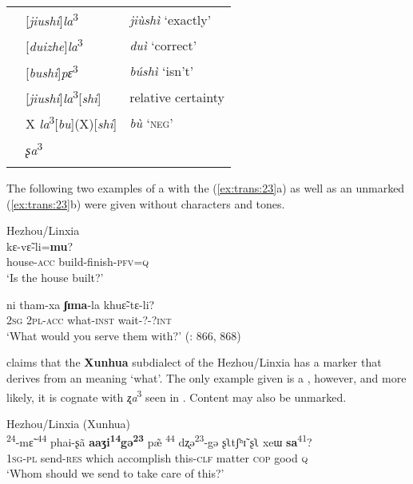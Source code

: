 \begin{table}
\begin{tabularx}{\textwidth}{llQ}
& [\textit{jiushi}]\textit{la}\textsuperscript{3} &  \textit{jiùshì} ‘exactly’\\
& [\textit{duizhe}]\textit{la}\textsuperscript{3} &  \textit{duì} ‘correct’\\
& [\textit{bushi}]\textit{pɛ}\textsuperscript{3} &  \textit{búshì} ‘isn’t’\\
& [\textit{jiushi}]\textit{la}\textsuperscript{3}[\textit{shi}] & relative certainty\\
& X \textit{la}\textsuperscript{3}[\textit{bu}](X)[\textit{shi}] &  \textit{bù} ‘\textsc{neg}’\\
& \textit{ʂa}\textsuperscript{3} & \\
\lspbottomrule
\end{tabularx}
\end{table}

The following two examples of a  with the   (\ref{ex:trans:23}a) as well as an unmarked  (\ref{ex:trans:23}b) were given without characters and tones.

\newpage
\ea%
    \label{ex:trans:23}
    Hezhou/Linxia\\
    \ea
        kɛ-v\~{ɛ}-li=\textbf{{mu}}?\\
    house-\textsc{acc}  build-finish-\textsc{pfv}=\textsc{q}\\
    \glt ‘Is the house built?’
    
    \ex
    \gll ni  tham-xa \textbf{{ʃɪma}}-la  khu\~{ɛ}-tɛ-li?\\
    2\textsc{sg}  2\textsc{pl}-\textsc{acc}  what-\textsc{inst}  wait-?-?\textsc{int}\\
    \glt ‘What would you serve them with?’ (\citealt{Lee-Smith1996b}: 866, 868)
    \z
    \z

\citet[158]{Dwyer1995} claims that the \textbf{Xunhua} subdialect of the Hezhou/Linxia  has a  marker that derives from an  meaning ‘what’. The only example given is a , however, and more likely, it is cognate with \textit{ʐa}\textsuperscript{3} seen in . Content  may also be unmarked.

  
\ea%
    \label{ex:trans:24}
    Hezhou/Linxia (Xunhua)\\
    \ea
    \textsuperscript{24}{-m}{\~{ɛ}} \textsuperscript{44}  {phai-ʂã}    \textbf{{aaʒi}}\textbf{\textsuperscript{14}}\textbf{{gə}}\textbf{\textsuperscript{23}}  {{\textquotedbl}p}{\~{æ}}\textsuperscript{ 44}    {dʐə}\textsuperscript{23}{-gə ʂʅtʃʰ}{\~{ɪ} }  {ʂʅ}  {xeɯ}  \textbf{{sa}}\textsuperscript{41}?\\
    1\textsc{sg}-\textsc{pl}    send-\textsc{res}  which    accomplish  this-\textsc{clf} matter  \textsc{cop}  good  \textsc{q}\\
    \glt ‘Whom should we send to take care of this?’
    
